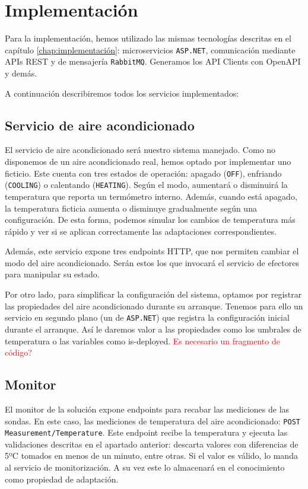 \section{Implementación}

Para la implementación, hemos utilizado las mismas tecnologías descritas en el capítulo \ref{chap:implementación}: microservicios \texttt{ASP.NET}, comunicación mediante APIs REST y  de mensajería \texttt{RabbitMQ}. Generamos los API Clients con OpenAPI y demás.

A continuación describiremos todos los servicios implementados:

\subsection{Servicio de aire acondicionado}

El servicio de aire acondicionado será nuestro sistema manejado. Como no disponemos de un aire acondicionado real, hemos optado por implementar uno ficticio. Este cuenta con tres estados de operación: apagado (\texttt{OFF}), enfriando (\texttt{COOLING}) o calentando (\texttt{HEATING}). Según el modo, aumentará o disminuirá la temperatura que reporta un termómetro interno. Además, cuando está apagado, la temperatura ficticia aumenta o disminuye gradualmente según una configuración. De esta forma, podemos simular los cambios de temperatura más rápido y ver si se aplican correctamente las adaptaciones correspondientes.

Además, este servicio expone tres endpoints HTTP, que nos permiten cambiar el modo del aire acondicionado. Serán estos los que invocará el servicio de efectores para manipular su estado.

Por otro lado, para simplificar la configuración del sistema, optamos por registrar las propiedades del aire acondicionado durante su arranque. Tenemos para ello un servicio en segundo plano (un  de \texttt{ASP.NET}) que registra la configuración inicial durante el arranque. Así le daremos valor a las propiedades como los umbrales de temperatura o las variables como is-deployed. \textcolor{red}{Es necesario un fragmento de código?}

\subsection{Monitor}

El monitor de la solución expone endpoints para recabar las mediciones de las sondas. En este caso, las mediciones de temperatura del aire acondicionado: \texttt{POST Measurement/Temperature}. Este endpoint recibe la temperatura y ejecuta las validaciones descritas en el apartado anterior: descarta valores con diferencias de 5ºC tomados en menos de un minuto, entre otras. Si el valor es válido, lo manda al servicio de monitorización. A su vez este lo almacenará en el conocimiento como propiedad de adaptación.

